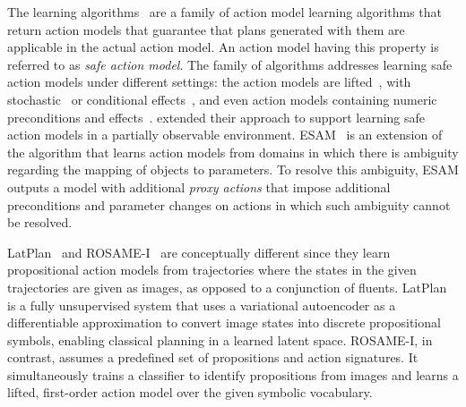 The \sam learning algorithms~\citep{stern2017efficient,mordoch2023learning,juba2021safe,juba2022learning,le2024learning,mordoch2024safe} are a family of action model learning algorithms that return action models that guarantee that plans generated with them are applicable in the actual action model. 
An action model having this property is referred to as \emph{safe action model}.
The \sam family of algorithms addresses learning safe action models under different settings: 
the action models are lifted~\citep{juba2021safe}, with stochastic~\citep{juba2022learning} or conditional effects~\citep{mordoch2024safe}, and even action models containing numeric preconditions and effects~\citep{mordoch2023learning}.
\citet{le2024learning} extended their approach to support learning safe action models in a partially observable environment. 
ESAM~\citep{juba2021safe} is an extension of the \sam algorithm that learns action models from domains in which there is ambiguity regarding the mapping of objects to parameters. To resolve this ambiguity, ESAM outputs a model with additional \emph{proxy actions} that impose additional preconditions and parameter changes on actions in which such ambiguity cannot be resolved. 



LatPlan~\citep{asai2022classical} and ROSAME-I~\citep{xi2024neuro} are conceptually different since they learn propositional action models from trajectories where the states in the given trajectories are given as images, as opposed to a conjunction of fluents. 
LatPlan is a fully unsupervised system that uses a variational autoencoder as a differentiable approximation to convert image states into discrete propositional symbols, enabling classical planning in a learned latent space.
ROSAME-I, in contrast, assumes a predefined set of propositions and action signatures. It simultaneously trains a classifier to identify propositions from images and learns a lifted, first-order action model over the given symbolic vocabulary.

